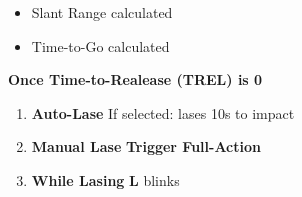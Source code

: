 \documentclass[fontInter]{TechCheck}
\begin{document}
\begin{longtablenumerate}
{\begin{tableminipage}
\begin{enumerate}
				\begin{itemize}
					\item Slant Range calculated
					\item Time-to-Go calculated
				\end{itemize}
			\end{enumerate}
			\textbf{Once Time-to-Realease (TREL) is 0}
			\begin{enumerate}[label=(\alph*), resume]
				\item \textbf{Auto-Lase} \dotfill If selected: lases 10s to impact
				\item \textbf{Manual Lase} \dotfill \textbf{Trigger Full-Action}
				\item \textbf{While Lasing} \dotfill \textbf{L} blinks
			\end{enumerate}
		\end{tableminipage}}
	\end{longtablenumerate}
\end{document}

